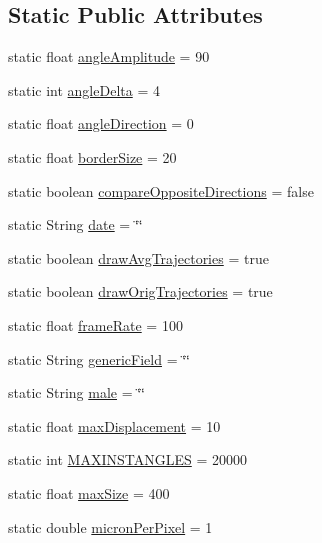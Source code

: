 \subsection*{Static Public Attributes}
\begin{DoxyCompactItemize}
\item 
static float \hyperlink{classdata_1_1_params_a42568ad774d8f4ccb9535aeda39fc883}{angle\+Amplitude} = 90
\item 
static int \hyperlink{classdata_1_1_params_a93caa48162e34b2227a839ed71b4ed44}{angle\+Delta} = 4
\item 
static float \hyperlink{classdata_1_1_params_a11ad187f45e1f7add56bde4071bfdf74}{angle\+Direction} = 0
\item 
static float \hyperlink{classdata_1_1_params_a20fc9eabd567449950e284f07669ec93}{border\+Size} = 20
\item 
static boolean \hyperlink{classdata_1_1_params_a8c0dba3f8308ea1257549b3cef11ea23}{compare\+Opposite\+Directions} = false
\item 
static String \hyperlink{classdata_1_1_params_aecbab8174a6d72649883508cf9940d58}{date} = \char`\"{}\char`\"{}
\item 
static boolean \hyperlink{classdata_1_1_params_a3e846fb606e7abcd1e78bebb5292e4c2}{draw\+Avg\+Trajectories} = true
\item 
static boolean \hyperlink{classdata_1_1_params_a207f2cfc882f842eafc04f6531308e98}{draw\+Orig\+Trajectories} = true
\item 
static float \hyperlink{classdata_1_1_params_a398ccb086e2e7150576bec8a5853b8e3}{frame\+Rate} = 100
\item 
static String \hyperlink{classdata_1_1_params_a253e4e926c0399ed1ae42b5a5989824d}{generic\+Field} = \char`\"{}\char`\"{}
\item 
static String \hyperlink{classdata_1_1_params_a3e07114fb70a676dfe24fad6be8c3c75}{male} = \char`\"{}\char`\"{}
\item 
static float \hyperlink{classdata_1_1_params_ab28f784a26ca9d2ce7d7a785b158aa61}{max\+Displacement} = 10
\item 
static int \hyperlink{classdata_1_1_params_a11078ae453283411c72774c45caa7519}{M\+A\+X\+I\+N\+S\+T\+A\+N\+G\+L\+ES} = 20000
\item 
static float \hyperlink{classdata_1_1_params_a7274c4f365a3b3d5e70f4c0e797684ac}{max\+Size} = 400
\item 
static double \hyperlink{classdata_1_1_params_a19331ee97ef3c422984fc7dff976549e}{micron\+Per\+Pixel} = 1
\item 

\end{DoxyCompactItemize}
